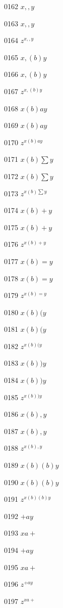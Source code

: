 \documentclass{article}
\begin{document}
0162 $\displaystyle x,,y$\par
0163 $x,,y$\par
0164 $z^{x,,y}$\par
0165 $\displaystyle x,\left(b\right) y$\par
0166 $x,\left(b\right) y$\par
0167 $z^{x,\left(b\right) y}$\par
0168 $\displaystyle x\left(b\right) ay$\par
0169 $x\left(b\right) ay$\par
0170 $z^{x\left(b\right) ay}$\par
0171 $\displaystyle x\left(b\right) \sum y$\par
0172 $x\left(b\right) \sum y$\par
0173 $z^{x\left(b\right) \sum y}$\par
0174 $\displaystyle x\left(b\right) +y$\par
0175 $x\left(b\right) +y$\par
0176 $z^{x\left(b\right) +y}$\par
0177 $\displaystyle x\left(b\right) =y$\par
0178 $x\left(b\right) =y$\par
0179 $z^{x\left(b\right) =y}$\par
0180 $\displaystyle x\left(b\right) (y$\par
0181 $x\left(b\right) (y$\par
0182 $z^{x\left(b\right) (y}$\par
0183 $\displaystyle x\left(b\right) )y$\par
0184 $x\left(b\right) )y$\par
0185 $z^{x\left(b\right) )y}$\par
0186 $\displaystyle x\left(b\right) ,y$\par
0187 $x\left(b\right) ,y$\par
0188 $z^{x\left(b\right) ,y}$\par
0189 $\displaystyle x\left(b\right) \left(b\right) y$\par
0190 $x\left(b\right) \left(b\right) y$\par
0191 $z^{x\left(b\right) \left(b\right) y}$\par
0192 $\displaystyle +ay$\par
0193 $\displaystyle xa+$\par
0194 $+ay$\par
0195 $xa+$\par
0196 $z^{+ay}$\par
0197 $z^{xa+}$\par
\end{document}
